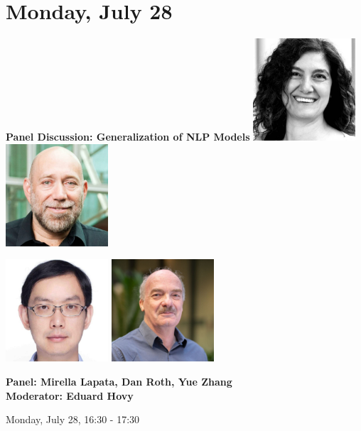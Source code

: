 \section{Monday, July 28}
\vspace*{0.2cm}

\begin{center}
    {\Large \textbf{Panel Discussion: Generalization of NLP Models}}
    \vspace*{0.2cm}
    \includegraphics[width=1.5in]{examples/acl25-handbook/invited_talks/Mirella.jpg}
    \includegraphics[width=1.5in]{examples/acl25-handbook/invited_talks/Dan.jpg}

    \includegraphics[width=1.5in]{examples/acl25-handbook/invited_talks/Yue.jpg}
    \includegraphics[width=1.5in]{examples/acl25-handbook/invited_talks/Ed.jpg}
    
    {\large \textbf{Panel: Mirella Lapata, Dan Roth, Yue Zhang}}\\
    {\large \textbf{Moderator: Eduard Hovy}}

    Monday, July 28, 16:30 - 17:30
\end{center}

